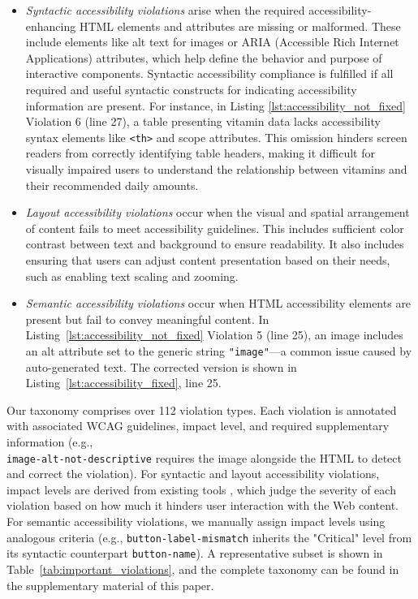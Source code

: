 \documentclass[sigconf, nonacm]{acmart}
\begin{document}
\begin{itemize}
    \item \emph{Syntactic accessibility violations} arise when the required accessibility-enhancing HTML elements and attributes are missing or malformed. These include elements like alt text for images or ARIA (Accessible Rich Internet Applications) attributes, which help define the behavior and purpose of interactive components. Syntactic accessibility compliance is fulfilled if all required and useful syntactic constructs for indicating accessibility information are present. For instance, in Listing \ref{lst:accessibility_not_fixed} Violation 6 (line 27), a table presenting vitamin data lacks accessibility syntax elements like \texttt{<th>} and scope attributes. This omission hinders screen readers from correctly identifying table headers, making it difficult for visually impaired users to understand the relationship between vitamins and their recommended daily amounts.

\item \emph{Layout accessibility violations} occur when the visual and spatial arrangement of content fails to meet accessibility guidelines. This includes sufficient color contrast between text and background to ensure readability. It also includes ensuring that users can adjust content presentation based on their needs, such as enabling text scaling and zooming.


\item \emph{Semantic accessibility violations} occur when HTML accessibility elements are present but fail to convey meaningful content. In Listing~\ref{lst:accessibility_not_fixed} Violation 5 (line 25), an image includes an alt attribute set to the generic string \texttt{"image"}—a common issue caused by auto-generated text. The corrected version is shown in Listing~\ref{lst:accessibility_fixed}, line 25.
\end{itemize}
Our taxonomy comprises over 112 violation types. Each violation is annotated with associated WCAG guidelines, impact level, and required supplementary information (e.g., \\ \texttt{image-alt-not-descriptive} requires the image alongside the HTML to detect and correct the violation). For syntactic and layout accessibility violations, impact levels are derived from existing tools \cite{PlaywrightAPI}, which judge the severity of each violation based on how much it hinders user interaction with the Web content. For semantic accessibility violations, we manually assign impact levels using analogous criteria (e.g., \texttt{button-label-mismatch} inherits the "Critical" level from its syntactic counterpart \texttt{button-name}). A representative subset is shown in Table~\ref{tab:important_violations}, and the complete taxonomy can be found in the supplementary material of this paper.
\end{document}
